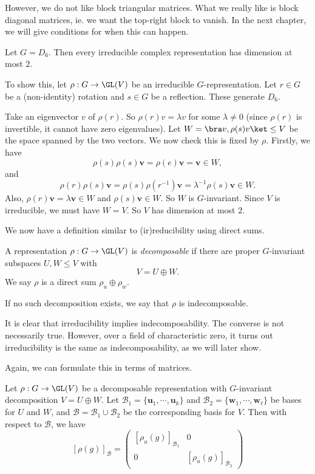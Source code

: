 \documentclass[a4paper]{article}
\begin{document}
However, we do not like block triangular matrices. What we really like is block diagonal matrices, ie. we want the top-right block to vanish. In the next chapter, we will give conditions for when this can happen.

\begin{eg}
  Let $G = D_6$. Then every irreducible complex representation has dimension at most $2$.

  To show this, let $\rho: G \to \GL(V)$ be an irreducible $G$-representation. Let $r \in G$ be a (non-identity) rotation and $s\in G$ be a reflection. These generate $D_6$.

  Take an eigenvector $v$ of $\rho(r)$. So $\rho(r) v = \lambda v$ for some $\lambda \not= 0$ (since $\rho(r)$ is invertible, it cannot have zero eigenvalues). Let $W = \bra v, \rho(s) v\ket \leq V$ be the space spanned by the two vectors. We now check this is fixed by $\rho$. Firstly, we have
  \[
    \rho(s)\rho(s) \mathbf{v} = \rho(e) \mathbf{v} = \mathbf{v} \in W,
  \]
  and
  \[
    \rho(r)\rho(s) \mathbf{v} = \rho(s) \rho(r^{-1}) \mathbf{v} = \lambda^{-1} \rho(s) \mathbf{v} \in W.
  \]
  Also, $\rho(r) \mathbf{v} = \lambda \mathbf{v} \in W$ and $\rho(s) \mathbf{v} \in W$. So $W$ is $G$-invariant. Since $V$ is irreducible, we must have $W = V$. So $V$ has dimension at most $2$.
\end{eg}

We now have a definition similar to (ir)reducibility using direct sums.
\begin{defi}[(In)decomposable]
  A representation $\rho: G \to \GL(V)$ is \emph{decomposable} if there are proper $G$-invariant subspaces $U, W \leq V$ with
  \[
    V = U \oplus W.
  \]
  We say $\rho$ is a direct sum $\rho_u \oplus \rho_w$.

  If no such decomposition exists, we say that $\rho$ is indecomposable.
\end{defi}
It is clear that irreducibility implies indecomposability. The converse is not necessarily true. However, over a field of characteristic zero, it turns out irreducibility is the same as indecomposability, as we will later show.

Again, we can formulate this in terms of matrices.
\begin{lemma}
  Let $\rho: G \to \GL(V)$ be a decomposable representation with $G$-invariant decomposition $V = U \oplus W$. Let $\mathcal{B}_1 = \{\mathbf{u}_1, \cdots, \mathbf{u}_k\}$ and $\mathcal{B}_2 = \{\mathbf{w}_1, \cdots, \mathbf{w}_\ell\}$ be bases for $U$ and $W$, and $\mathcal{B} = \mathcal{B}_1 \cup \mathcal{B}_2$ be the corresponding basis for $V$. Then with respect to $\mathcal{B}$, we have
  \[
    [\rho(g)]_{\mathcal{B}} =
    \begin{pmatrix}
      [\rho_u(g)]_{\mathcal{B}_1} & 0\\
      0 & [\rho_u (g)]_{\mathcal{B}_2}
    \end{pmatrix}
  \]
\end{lemma}
\end{document}
